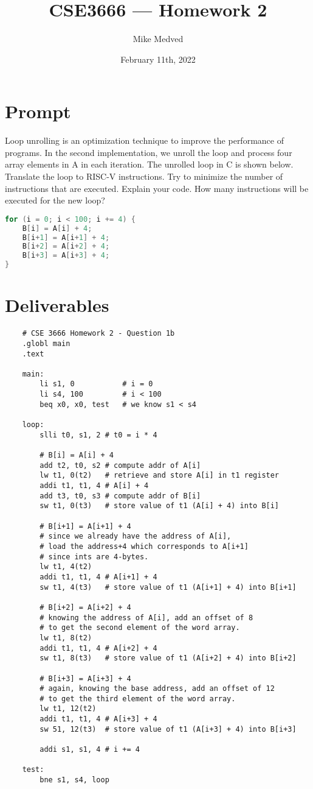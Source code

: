 \documentclass{article}
\title{CSE3666 — Homework 2}
\author{Mike Medved}
\date{February 11th, 2022}
\begin{document}
\maketitle

\section{Prompt}
Loop unrolling is an optimization technique to improve the performance of programs. In
the second implementation, we unroll the loop and process four array elements in A in
each iteration. The unrolled loop in C is shown below. Translate the loop to RISC-V
instructions. Try to minimize the number of instructions that are executed. Explain your
code. How many instructions will be executed for the new loop?

\hfill
\begin{lstlisting}[language=C]
for (i = 0; i < 100; i += 4) {
    B[i] = A[i] + 4;
    B[i+1] = A[i+1] + 4;
    B[i+2] = A[i+2] + 4;
    B[i+3] = A[i+3] + 4;
}
\end{lstlisting}

\section{Deliverables}
    \begin{lstlisting}
    # CSE 3666 Homework 2 - Question 1b
    .globl main
    .text
    
    main:
        li s1, 0           # i = 0
        li s4, 100         # i < 100
        beq x0, x0, test   # we know s1 < s4
    
    loop:
        slli t0, s1, 2 # t0 = i * 4
        
        # B[i] = A[i] + 4
        add t2, t0, s2 # compute addr of A[i]
        lw t1, 0(t2)   # retrieve and store A[i] in t1 register
        addi t1, t1, 4 # A[i] + 4
        add t3, t0, s3 # compute addr of B[i]
        sw t1, 0(t3)   # store value of t1 (A[i] + 4) into B[i]
        
        # B[i+1] = A[i+1] + 4
        # since we already have the address of A[i], 
        # load the address+4 which corresponds to A[i+1]
        # since ints are 4-bytes.
        lw t1, 4(t2)
        addi t1, t1, 4 # A[i+1] + 4
        sw t1, 4(t3)   # store value of t1 (A[i+1] + 4) into B[i+1]
        
        # B[i+2] = A[i+2] + 4
        # knowing the address of A[i], add an offset of 8
        # to get the second element of the word array.
        lw t1, 8(t2) 
        addi t1, t1, 4 # A[i+2] + 4
        sw t1, 8(t3)   # store value of t1 (A[i+2] + 4) into B[i+2]
        
        # B[i+3] = A[i+3] + 4
        # again, knowing the base address, add an offset of 12
        # to get the third element of the word array.
        lw t1, 12(t2)
        addi t1, t1, 4 # A[i+3] + 4
        sw 51, 12(t3)  # store value of t1 (A[i+3] + 4) into B[i+3]
        
        addi s1, s1, 4 # i += 4
    
    test:
        bne s1, s4, loop
    \end{lstlisting}
\end{document}
